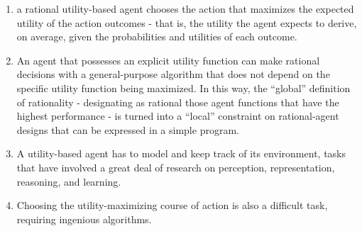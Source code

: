 \begin{enumerate}[itemsep=0.2cm]
    \item a rational utility-based agent chooses the action that maximizes the expected utility of the action outcomes - that is, the utility the agent expects to derive, on average, given the probabilities and utilities of each outcome.
    \hfill \cite{ai/book/Artificial-Intelligence-A-Modern-Approach/Russell-Norvig}

    \item An agent that possesses an explicit utility function can make rational decisions with a general-purpose algorithm that does not depend on the specific utility function being maximized. In this way, the “global” definition of rationality - designating as rational those agent functions that have the highest performance - is turned into a “local” constraint on rational-agent designs that can be expressed in a simple program.
    \hfill \cite{ai/book/Artificial-Intelligence-A-Modern-Approach/Russell-Norvig}

    \item A utility-based agent has to model and keep track of its environment, tasks that have involved a great deal of research on perception, representation, reasoning, and learning.
    \hfill \cite{ai/book/Artificial-Intelligence-A-Modern-Approach/Russell-Norvig}

    \item Choosing the utility-maximizing course of action is also a difficult task, requiring ingenious algorithms.
    \hfill \cite{ai/book/Artificial-Intelligence-A-Modern-Approach/Russell-Norvig}
\end{enumerate}



\vspace{0.5cm}


